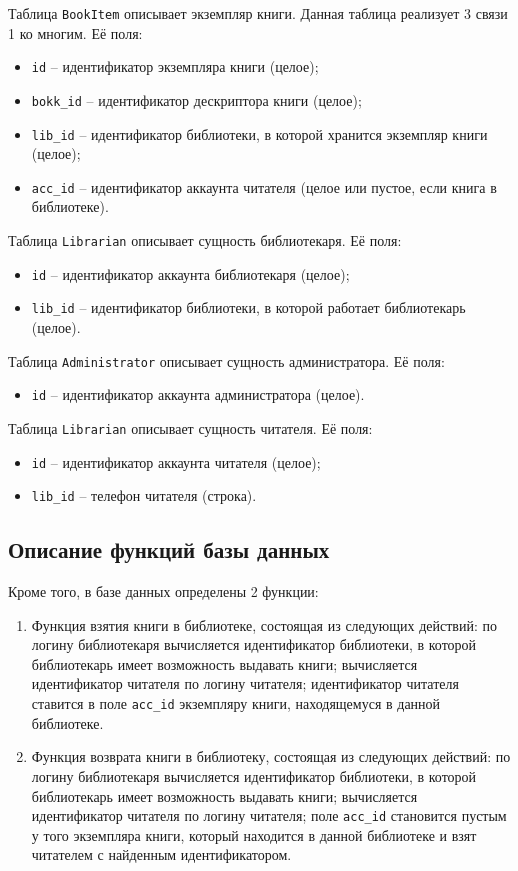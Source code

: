 Таблица \texttt{BookItem} описывает экземпляр книги. Данная таблица реализует 3 связи 1 ко многим. Её поля:
\begin{itemize}
	\item \texttt{id} -- идентификатор экземпляра книги (целое);
	\item \texttt{bokk\_id} -- идентификатор дескриптора книги (целое);
	\item \texttt{lib\_id} -- идентификатор библиотеки, в которой хранится экземпляр книги (целое);
	\item \texttt{acc\_id} -- идентификатор аккаунта читателя (целое или пустое, если книга в библиотеке).
\end{itemize}

Таблица \texttt{Librarian} описывает сущность библиотекаря. Её поля:
\begin{itemize}
	\item \texttt{id} -- идентификатор аккаунта библиотекаря (целое);
	\item \texttt{lib\_id} -- идентификатор библиотеки, в которой работает библиотекарь (целое).
\end{itemize}

Таблица \texttt{Administrator} описывает сущность администратора. Её поля:
\begin{itemize}
	\item \texttt{id} -- идентификатор аккаунта администратора (целое).
\end{itemize}

Таблица \texttt{Librarian} описывает сущность читателя. Её поля:
\begin{itemize}
	\item \texttt{id} -- идентификатор аккаунта читателя (целое);
	\item \texttt{lib\_id} -- телефон читателя (строка).
\end{itemize}
\newpage
\subsection{Описание функций базы данных}
Кроме того, в базе данных определены 2 функции:
\begin{enumerate}
    \item Функция взятия книги в библиотеке, состоящая из следующих действий: по логину библиотекаря вычисляется идентификатор библиотеки, в которой библиотекарь имеет возможность выдавать книги; вычисляется идентификатор читателя по логину читателя; идентификатор читателя ставится в поле \texttt{acc\_id} экземпляру книги, находящемуся в данной библиотеке. 
    \item Функция возврата книги в библиотеку, состоящая из следующих действий: по логину библиотекаря вычисляется идентификатор библиотеки, в которой библиотекарь имеет возможность выдавать книги; вычисляется идентификатор читателя по логину читателя; поле \texttt{acc\_id} становится пустым у того экземпляра книги, который находится в данной библиотеке и взят читателем с найденным идентификатором. 
\end{enumerate}


